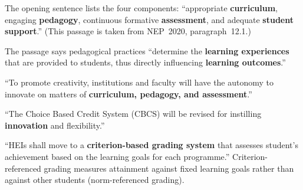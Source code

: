 The opening sentence lists the four components: ``appropriate \textbf{curriculum}, engaging \textbf{pedagogy}, continuous formative \textbf{assessment}, and adequate \textbf{student support}.''
(This passage is taken from NEP~2020, paragraph~12.1.)

The passage says pedagogical practices ``determine the \textbf{learning experiences} that are provided to students, thus directly influencing \textbf{learning outcomes}.''

``To promote creativity, institutions and faculty will have the autonomy to innovate on matters of \textbf{curriculum, pedagogy, and assessment}.''

``The Choice Based Credit System (CBCS) will be revised for instilling \textbf{innovation} and flexibility.''

``HEIs shall move to a \textbf{criterion-based grading system} that assesses student's achievement based on the learning goals for each programme.'' Criterion-referenced grading measures attainment against fixed learning goals rather than against other students (norm-referenced grading).
